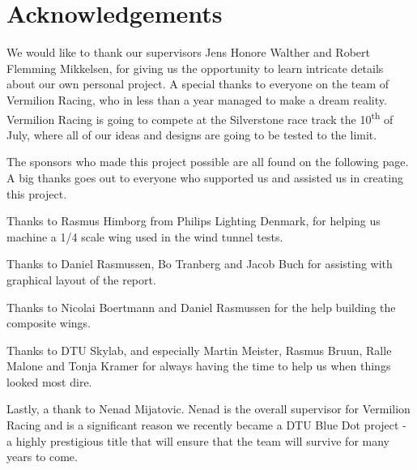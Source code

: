 \chapter*{Acknowledgements}

We would like to thank our supervisors Jens Honore Walther and Robert Flemming Mikkelsen, for giving us the opportunity to learn intricate details about our own personal project. A special thanks to everyone on the team of Vermilion Racing, who in less than a year managed to make a dream reality. Vermilion Racing is going to compete at the Silverstone race track the 10\textsuperscript{th} of July, where all of our ideas and designs are going to be tested to the limit.

The sponsors who made this project possible are all found on the following page. A big thanks goes out to everyone who supported us and assisted us in creating this project.

Thanks to Rasmus Himborg from Philips Lighting Denmark, for helping us machine a 1/4 scale wing used in the wind tunnel tests.

Thanks to Daniel Rasmussen, Bo Tranberg and Jacob Buch for assisting with graphical layout of the report.

Thanks to Nicolai Boertmann and Daniel Rasmussen for the help building the composite wings.

Thanks to DTU Skylab, and especially Martin Meister, Rasmus Bruun, Ralle Malone and Tonja Kramer for always having the time to help us when things looked most dire.

Lastly, a thank to Nenad Mijatovic. Nenad is the overall supervisor for Vermilion Racing and is a significant reason we recently became a DTU Blue Dot project - a highly prestigious title that will ensure that the team will survive for many years to come.

\begin{figure}
  \label{fig:sponsorstack}
\end{figure}
